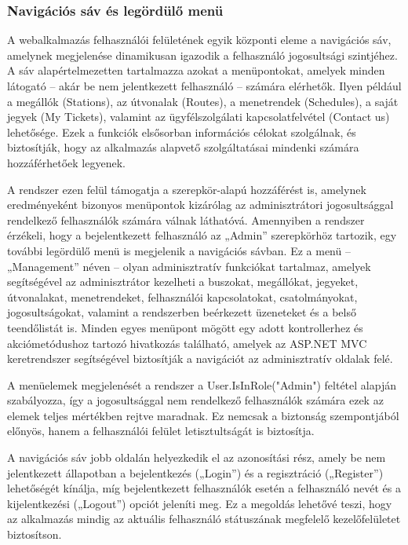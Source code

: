 \subsubsection{Navigációs sáv és legördülő menü }
A webalkalmazás felhasználói felületének egyik központi eleme a navigációs sáv, amelynek megjelenése dinamikusan igazodik a felhasználó jogosultsági szintjéhez. A sáv alapértelmezetten tartalmazza azokat a menüpontokat, amelyek minden látogató – akár be nem jelentkezett felhasználó – számára elérhetők. Ilyen például a megállók (Stations), az útvonalak (Routes), a menetrendek (Schedules), a saját jegyek (My Tickets), valamint az ügyfélszolgálati kapcsolatfelvétel (Contact us) lehetősége. Ezek a funkciók elsősorban információs célokat szolgálnak, és biztosítják, hogy az alkalmazás alapvető szolgáltatásai mindenki számára hozzáférhetőek legyenek.

A rendszer ezen felül támogatja a szerepkör-alapú hozzáférést is, amelynek eredményeként bizonyos menüpontok kizárólag az adminisztrátori jogosultsággal rendelkező felhasználók számára válnak láthatóvá. Amennyiben a rendszer érzékeli, hogy a bejelentkezett felhasználó az „Admin” szerepkörhöz tartozik, egy további legördülő menü is megjelenik a navigációs sávban. Ez a menü – „Management” néven – olyan adminisztratív funkciókat tartalmaz, amelyek segítségével az adminisztrátor kezelheti a buszokat, megállókat, jegyeket, útvonalakat, menetrendeket, felhasználói kapcsolatokat, csatolmányokat, jogosultságokat, valamint a rendszerben beérkezett üzeneteket és a belső teendőlistát is. Minden egyes menüpont mögött egy adott kontrollerhez és akciómetódushoz tartozó hivatkozás található, amelyek az ASP.NET MVC keretrendszer segítségével biztosítják a navigációt az adminisztratív oldalak felé.

A menüelemek megjelenését a rendszer a User.IsInRole("Admin") feltétel alapján szabályozza, így a jogosultsággal nem rendelkező felhasználók számára ezek az elemek teljes mértékben rejtve maradnak. Ez nemcsak a biztonság szempontjából előnyös, hanem a felhasználói felület letisztultságát is biztosítja.

A navigációs sáv jobb oldalán helyezkedik el az azonosítási rész, amely be nem jelentkezett állapotban a bejelentkezés („Login”) és a regisztráció („Register”) lehetőségét kínálja, míg bejelentkezett felhasználók esetén a felhasználó nevét és a kijelentkezési („Logout”) opciót jeleníti meg. Ez a megoldás lehetővé teszi, hogy az alkalmazás mindig az aktuális felhasználó státuszának megfelelő kezelőfelületet biztosítson.

